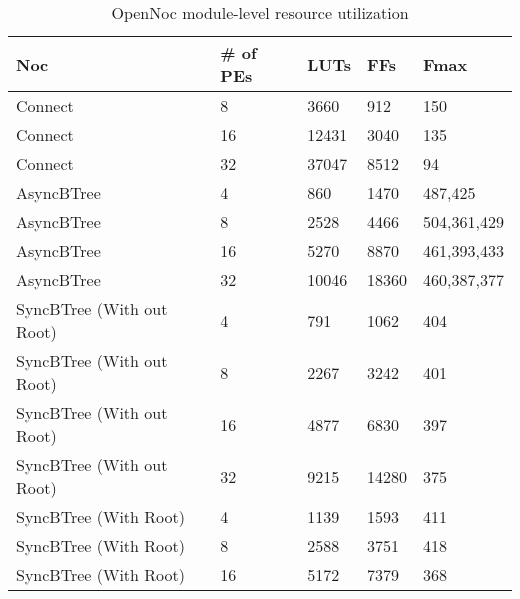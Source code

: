 \begin{table}[!t]
  \centering
  \caption{OpenNoc module-level resource utilization} 
  \begin{tabular}{l|l|l|l|l}
      \toprule
      Noc & \# of PEs & LUTs & FFs & Fmax \\
      \midrule
      \midrule
      Connect & 8      & 3660 & 912 & 150  \\
      Connect & 16     & 12431 & 3040 & 135 \\
      Connect & 32     & 37047 & 8512 & 94 \\    
      \midrule
      AsyncBTree & 4         & 860  & 1470 & 487,425\\
      AsyncBTree & 8         & 2528 & 4466 & 504,361,429\\
      AsyncBTree & 16        & 5270 & 8870 & 461,393,433 \\
      AsyncBTree & 32        & 10046 & 18360 & 460,387,377\\
      \midrule
      SyncBTree (With out Root) &  4         &  791 & 1062 & 404\\
      SyncBTree (With out Root) &  8         &  2267 & 3242 & 401\\
      SyncBTree (With out Root) &  16        &  4877 & 6830 & 397\\
      SyncBTree (With out Root) &  32        &  9215 & 14280 & 375\\
      \midrule      
      SyncBTree (With Root) &  4         &  1139 & 1593 & 411\\
      SyncBTree (With Root) &  8         &  2588 & 3751 & 418\\
      SyncBTree (With Root) &  16         &  5172 & 7379 & 368\\ 
      \bottomrule
    \end{tabular}
	\label{table:systemResourceConsumption}
\end{table}